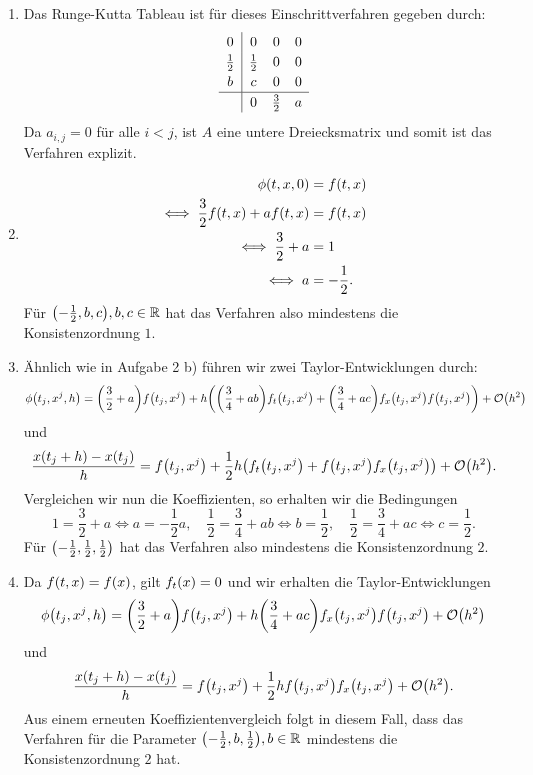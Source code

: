 \documentclass{exercise}
\begin{document}
	\begin{enumerate}
		\item Das Runge-Kutta Tableau ist für dieses Einschrittverfahren gegeben durch:
		\[
			\renewcommand\arraystretch{1.2}
			\begin{array}{c|ccc}
				0 & 0 & 0 & 0\\
				\frac{1}{2} & \frac{1}{2} & 0 & 0\\
				b & c & 0 & 0\\
				\hline
				& 0 & \frac{3}{2} & a
			\end{array}
		\]
		Da \(a_{i, j} = 0\) für alle \(i < j\), ist \(A\) eine untere Dreiecksmatrix und somit ist das Verfahren explizit.
		\item
		\begin{align*}
			\phi\parentheses*{t, x, 0} &= f\parentheses*{t, x}\\
			\iff \frac{3}{2}f\parentheses*{t, x} + af\parentheses*{t, x} &= f\parentheses*{t, x}\\
			\iff \frac{3}{2} + a &= 1\\
			\iff a &= -\frac{1}{2}.
		\end{align*}
		Für \(\parentheses*{-\frac{1}{2}, b, c}, b, c \in \R\) hat das Verfahren also mindestens die Konsistenzordnung \(1\).
		\item Ähnlich wie in Aufgabe 2 b) führen wir zwei Taylor-Entwicklungen durch:
		\[
			\phi\parentheses*{t_j, x^j, h} = \parentheses*{\frac{3}{2} + a}f\parentheses*{t_j, x^j} + h\parentheses*{\parentheses*{\frac{3}{4} + ab}f_t\parentheses*{t_j, x^j} + \parentheses*{\frac{3}{4} + ac}f_x\parentheses*{t_j, x^j}f\parentheses*{t_j, x^j}} + \mathcal{O}\parentheses*{h^2}
		\]
		und
		\[
			\frac{x\parentheses*{t_j + h} - x\parentheses*{t_j}}{h} = f\parentheses*{t_j, x^j} + \frac{1}{2}h\parentheses*{f_t\parentheses*{t_j, x^j} + f\parentheses*{t_j, x^j}f_x\parentheses*{t_j, x^j}} + \mathcal{O}\parentheses*{h^2}.
		\]
		Vergleichen wir nun die Koeffizienten, so erhalten wir die Bedingungen
		\[
			1 = \frac{3}{2} + a \iff a = -\frac{1}{2}a, \quad \frac{1}{2} = \frac{3}{4} + ab \iff b = \frac{1}{2}, \quad \frac{1}{2} = \frac{3}{4} + ac \iff c = \frac{1}{2}.
		\]
		Für \(\parentheses*{-\frac{1}{2}, \frac{1}{2}, \frac{1}{2}}\) hat das Verfahren also mindestens die Konsistenzordnung \(2\).
		\item Da \(f\parentheses*{t, x} = f\parentheses*{x}\), gilt \(f_t\parentheses*{x} = 0\) und wir erhalten die Taylor-Entwicklungen
		\[
			\phi\parentheses*{t_j, x^j, h} = \parentheses*{\frac{3}{2} + a}f\parentheses*{t_j, x^j} + h\parentheses*{\frac{3}{4} + ac}f_x\parentheses*{t_j, x^j}f\parentheses*{t_j, x^j} + \mathcal{O}\parentheses*{h^2}
		\]
		und
		\[
			\frac{x\parentheses*{t_j + h} - x\parentheses*{t_j}}{h} = f\parentheses*{t_j, x^j} + \frac{1}{2}hf\parentheses*{t_j, x^j}f_x\parentheses*{t_j, x^j} + \mathcal{O}\parentheses*{h^2}.
		\]
		Aus einem erneuten Koeffizientenvergleich folgt in diesem Fall, dass das Verfahren für die Parameter \(\parentheses*{-\frac{1}{2}, b, \frac{1}{2}}, b \in \R\) mindestens die Konsistenzordnung \(2\) hat.
	\end{enumerate}
\end{document}
